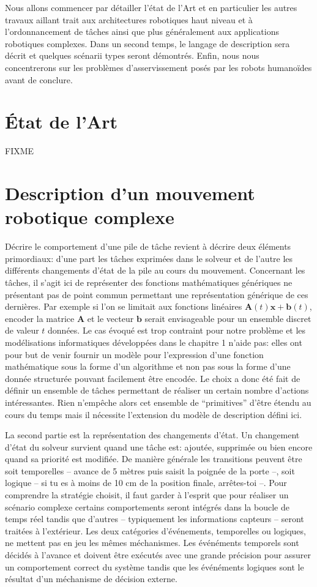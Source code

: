Nous allons commencer par détailler l'état de l'Art et en particulier
les autres travaux aillant trait aux architectures robotiques haut
niveau et à l'ordonnancement de tâches ainsi que plus généralement aux
applications robotiques complexes. Dans un second temps, le langage de
description sera décrit et quelques scénarii types seront
démontrés. Enfin, nous nous concentrerons sur les problèmes
d'asservissement posés par les robots humanoïdes avant de conclure.


\section{\'Etat de l'Art}

FIXME

\section{Description d'un mouvement robotique complexe}


Décrire le comportement d'une pile de tâche revient à décrire deux
éléments primordiaux: d'une part les tâches exprimées dans le solveur
et de l'autre les différents changements d'état de la pile au cours du
mouvement. Concernant les tâches, il s'agit ici de représenter des
fonctions mathématiques génériques ne présentant pas de point commun
permettant une représentation générique de ces dernières. Par exemple
si l'on se limitait aux fonctions linéaires $\mathbf{A}(t) \mathbf{x}
+ \mathbf{b}(t)$, encoder la matrice $\mathbf{A}$ et le vecteur
$\mathbf{b}$ serait envisageable pour un ensemble discret de valeur
$t$ données. Le cas évoqué est trop contraint pour notre problème et
les modélisations informatiques développées dans le chapitre 1 n'aide
pas: elles ont pour but de venir fournir un modèle pour l'expression
d'une fonction mathématique sous la forme d'un algorithme et non pas
sous la forme d'une donnée structurée pouvant facilement être encodée.
Le choix a donc été fait de définir un ensemble de tâches permettant
de réaliser un certain nombre d'actions intéressantes. Rien n'empêche
alors cet ensemble de ``primitives'' d'être étendu au cours du temps
mais il nécessite l'extension du modèle de description défini ici.


La second partie est la représentation des changements d'état. Un
changement d'état du solveur survient quand une tâche est: ajoutée,
supprimée ou bien encore quand sa priorité est modifiée. De manière
générale les transitions peuvent être soit temporelles -- avance de 5
mètres puis saisit la poignée de la porte --, soit logique -- si tu es
à moins de 10 cm de la position finale, arrêtes-toi --. Pour
comprendre la stratégie choisit, il faut garder à l'esprit que pour
réaliser un scénario complexe certains comportements seront intégrés
dans la boucle de temps réel tandis que d'autres -- typiquement les
informations capteurs -- seront traitées à l'extérieur. Les deux
catégories d'événements, temporelles ou logiques, ne mettent pas en
jeu les mêmes méchanismes. Les événéments temporels sont décidés à
l'avance et doivent être exécutés avec une grande précision pour
assurer un comportement correct du système tandis que les événéments
logiques sont le résultat d'un méchanisme de décision externe.

